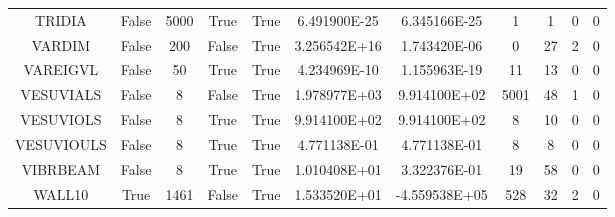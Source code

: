\begin{longtable}{ccccccccccc}
	\cellcolor{default2} TRIDIA& \cellcolor{default2} False& \cellcolor{default2} 5000& \cellcolor{default2} True& \cellcolor{default2} True& \cellcolor{ok} 6.491900E-25& \cellcolor{best} 6.345166E-25& \cellcolor{best} 1& \cellcolor{best} 1& \cellcolor{default2} 0& \cellcolor{default2} 0\\
	\cellcolor{default1} VARDIM& \cellcolor{default1} False& \cellcolor{default1} 200& \cellcolor{default1} False& \cellcolor{default1} True& \cellcolor{poor} 3.256542E+16& \cellcolor{best} 1.743420E-06& \cellcolor{best} 0& \cellcolor{poor} 27& \cellcolor{default1} 2& \cellcolor{default1} 0\\
	\cellcolor{default2} VAREIGVL& \cellcolor{default2} False& \cellcolor{default2} 50& \cellcolor{default2} True& \cellcolor{default2} True& \cellcolor{ok} 4.234969E-10& \cellcolor{best} 1.155963E-19& \cellcolor{best} 11& \cellcolor{ok} 13& \cellcolor{default2} 0& \cellcolor{default2} 0\\
	\cellcolor{default1} VESUVIALS& \cellcolor{default1} False& \cellcolor{default1} 8& \cellcolor{default1} False& \cellcolor{default1} True& \cellcolor{poor} 1.978977E+03& \cellcolor{best} 9.914100E+02& \cellcolor{poor} 5001& \cellcolor{best} 48& \cellcolor{default1} 1& \cellcolor{default1} 0\\
	\cellcolor{default2} VESUVIOLS& \cellcolor{default2} False& \cellcolor{default2} 8& \cellcolor{default2} True& \cellcolor{default2} True& \cellcolor{ok} 9.914100E+02& \cellcolor{best} 9.914100E+02& \cellcolor{best} 8& \cellcolor{ok} 10& \cellcolor{default2} 0& \cellcolor{default2} 0\\
	\cellcolor{default1} VESUVIOULS& \cellcolor{default1} False& \cellcolor{default1} 8& \cellcolor{default1} True& \cellcolor{default1} True& \cellcolor{best} 4.771138E-01& \cellcolor{ok} 4.771138E-01& \cellcolor{best} 8& \cellcolor{best} 8& \cellcolor{default1} 0& \cellcolor{default1} 0\\
	\cellcolor{default2} VIBRBEAM& \cellcolor{default2} False& \cellcolor{default2} 8& \cellcolor{default2} True& \cellcolor{default2} True& \cellcolor{poor} 1.010408E+01& \cellcolor{best} 3.322376E-01& \cellcolor{best} 19& \cellcolor{poor} 58& \cellcolor{default2} 0& \cellcolor{default2} 0\\
	\cellcolor{default1} WALL10& \cellcolor{default1} True& \cellcolor{default1} 1461& \cellcolor{default1} False& \cellcolor{default1} True& \cellcolor{poor} 1.533520E+01& \cellcolor{best} -4.559538E+05& \cellcolor{poor} 528& \cellcolor{best} 32& \cellcolor{default1} 2& \cellcolor{default1} 0\\

\end{longtable}

